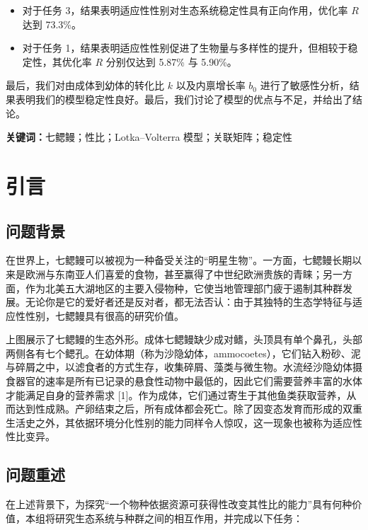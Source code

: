 \documentclass[11pt,a4paper]{ctexart}
\begin{document}
\begin{itemize}
\item 对于任务 3，结果表明适应性性别对生态系统稳定性具有正向作用，优化率 $R$ 达到 73.3\%。
\item 对于任务 1，结果表明适应性性别促进了生物量与多样性的提升，但相较于稳定性，其优化率 $R$ 分别仅达到 5.87\% 与 5.90\%。
\end{itemize}

最后，我们对由成体到幼体的转化比 $k$ 以及内禀增长率 $b_0$ 进行了敏感性分析，结果表明我们的模型稳定性良好。最后，我们讨论了模型的优点与不足，并给出了结论。

\vspace{6pt}
\noindent\textbf{关键词：}七鳃鳗；性比；Lotka--Volterra 模型；关联矩阵；稳定性

\newpage
\pagestyle{fancy}

\section{引言}

\subsection{问题背景}

在世界上，七鳃鳗可以被视为一种备受关注的“明星生物”。一方面，七鳃鳗长期以来是欧洲与东南亚人们喜爱的食物，甚至赢得了中世纪欧洲贵族的青睐；另一方面，作为北美五大湖地区的主要入侵物种，它使当地管理部门疲于遏制其种群发展。无论你是它的爱好者还是反对者，都无法否认：由于其独特的生态学特征与适应性性别，七鳃鳗具有很高的研究价值。

上图展示了七鳃鳗的生态外形。成体七鳃鳗缺少成对鳍，头顶具有单个鼻孔，头部两侧各有七个鳃孔。在幼体期（称为沙隐幼体，ammocoetes），它们钻入粉砂、泥与碎屑之中，以滤食者的方式生存，收集碎屑、藻类与微生物。水流经沙隐幼体摄食器官的速率是所有已记录的悬食性动物中最低的，因此它们需要营养丰富的水体才能满足自身的营养需求 [1]。作为成体，它们通过寄生于其他鱼类获取营养，从而达到性成熟。产卵结束之后，所有成体都会死亡。除了因变态发育而形成的双重生活史之外，其依据环境分化性别的能力同样令人惊叹，这一现象也被称为适应性性比变异。

\subsection{问题重述}

在上述背景下，为探究“一个物种依据资源可获得性改变其性比的能力”具有何种价值，本组将研究生态系统与种群之间的相互作用，并完成以下任务：
\end{document}
